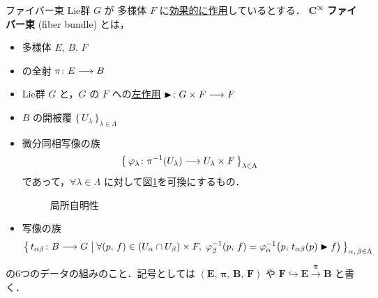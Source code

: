 \documentclass[TQFT_main]{subfiles}
\begin{document}
\begin{mydef}[label=def.fiber-1,breakable]{\cinfty ファイバー束}
    Lie群 $G$ が \cinfty 多様体 $F$ に\hyperref[def:Lie-action]{効果的に作用}しているとする．
    $\bm{C^\infty}$ \textbf{ファイバー束} (fiber bundle) とは，
    \begin{itemize}
        \item \cinfty 多様体 $E,\, B,\, F$
        \item \cinfty の全射 $\pi \colon E \longrightarrow B$
        \item Lie群 $G$ と，$G$ の $F$ への\hyperref[def:Lie-action]{左作用} $\blacktriangleright \colon G \times F \longrightarrow F$
        \item $B$ の開被覆 $\bigl\{\, U_\lambda  \,\bigr\}_{\lambda \in \Lambda}$
        \item 
        微分同相写像の族
        \begin{align}
            \bigl\{\, \varphi_\lambda \colon \pi^{-1}(U_\lambda) \longrightarrow U_\lambda \times F  \,\bigr\}_{\lambda \in \Lambda}
        \end{align}
        であって，$\forall \lambda \in \Lambda$ に対して図\ref{fig.fiber1}を可換にするもの．
        \begin{figure}[H]
            \centering
            \caption{局所自明性}
            \label{fig.fiber1}
        \end{figure}%
        \item \cinfty 写像の族
        \begin{align}
            \bigl\{\, t_{\alpha\beta} \colon B \longrightarrow G \bigm| \forall (p,\, f) \in (U_\alpha \cap U_\beta) \times F,\; \varphi_\beta^{-1} (p,\, f) = \varphi_\alpha^{-1} \bigl(p,\, t_{\alpha\beta} (p) \blacktriangleright f\bigr)  \,\bigr\}_{\alpha,\, \beta \in \Lambda}
        \end{align}
    \end{itemize}
    の6つのデータの組みのこと．記号としては $\bm{(E,\, \pi,\, B,\, F)}$ や $\bm{F \hookrightarrow E \xrightarrow{\pi} B}$ と書く．
		

\end{mydef}
\end{document}
